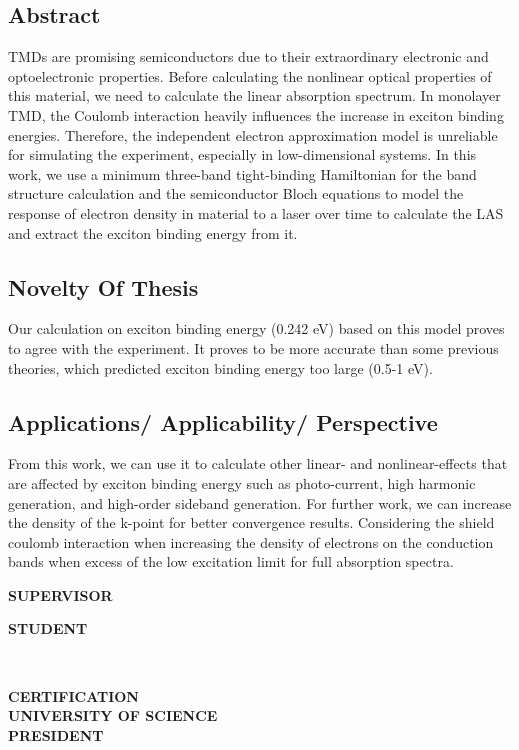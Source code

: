 \documentclass[12pt,english,a4paper]{article}
\begin{document}
\subsection*{Abstract}
\quad \acf{TMDs} are promising semiconductors due to their extraordinary electronic and optoelectronic properties. Before calculating the nonlinear optical properties of this material, we need to calculate the linear absorption spectrum. In monolayer TMD, the Coulomb interaction heavily influences the increase in exciton binding energies. Therefore, the independent electron approximation model is unreliable for simulating the experiment, especially in low-dimensional systems. In this work, we use a minimum three-band tight-binding Hamiltonian for the band structure calculation and the semiconductor Bloch equations to model the response of electron density in material to a laser over time to calculate the \ac{LAS} and extract the exciton binding energy from it.
\subsection*{Novelty Of Thesis}
\quad Our calculation on exciton binding energy (0.242 eV) based on this model proves to agree with the experiment. It proves to be more accurate than some previous theories, which predicted exciton binding energy too large (0.5-1 eV).
\subsection*{Applications/ Applicability/ Perspective}
\quad From this work, we can use it to calculate other linear- and nonlinear-effects that are affected by exciton binding energy such as photo-current, high harmonic generation, and high-order sideband generation. For further work, we can increase the density of the k-point for better convergence results. Considering the shield coulomb interaction when increasing the density of electrons on the conduction bands when excess of the low excitation limit for full absorption spectra.\\\null\newpage

\parbox{1.5in}{\centering \textbf{SUPERVISOR}} \hfill \parbox{2.5in}{\centering \textbf{STUDENT}}

\vspace{5\baselineskip}

\hfill\\\null\begin{center}
	
	\parbox{3.in}{\centering \textbf{CERTIFICATION\\ UNIVERSITY OF SCIENCE\\PRESIDENT}}
	\noindent 
\end{center}
	\newpage
\end{document}

